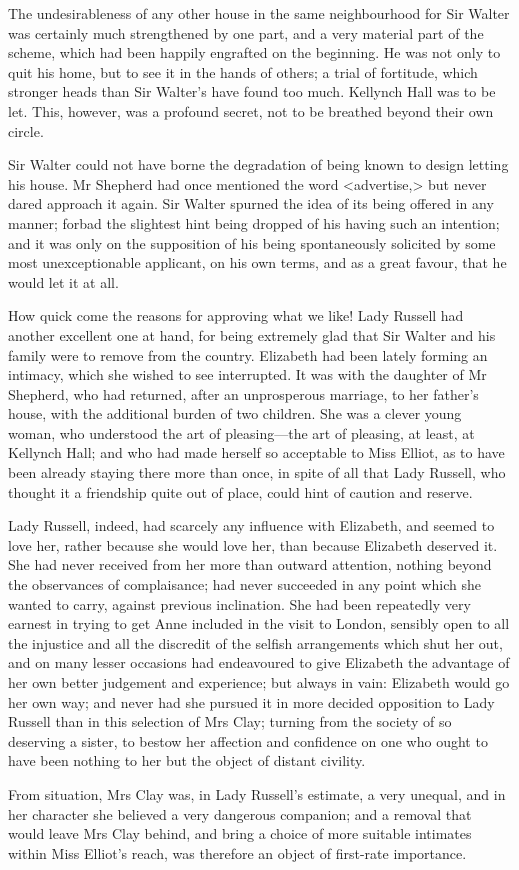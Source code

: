 The undesirableness of any other house in the same neighbourhood for Sir Walter was certainly much strengthened by one part, and a very material part of the scheme, which had been happily engrafted on the beginning. He was not only to quit his home, but to see it in the hands of others; a trial of fortitude, which stronger heads than Sir Walter's have found too much. Kellynch Hall was to be let. This, however, was a profound secret, not to be breathed beyond their own circle.

Sir Walter could not have borne the degradation of being known to design letting his house. Mr Shepherd had once mentioned the word <advertise,> but never dared approach it again. Sir Walter spurned the idea of its being offered in any manner; forbad the slightest hint being dropped of his having such an intention; and it was only on the supposition of his being spontaneously solicited by some most unexceptionable applicant, on his own terms, and as a great favour, that he would let it at all.

How quick come the reasons for approving what we like! Lady Russell had another excellent one at hand, for being extremely glad that Sir Walter and his family were to remove from the country. Elizabeth had been lately forming an intimacy, which she wished to see interrupted. It was with the daughter of Mr Shepherd, who had returned, after an unprosperous marriage, to her father's house, with the additional burden of two children. She was a clever young woman, who understood the art of pleasing—the art of pleasing, at least, at Kellynch Hall; and who had made herself so acceptable to Miss Elliot, as to have been already staying there more than once, in spite of all that Lady Russell, who thought it a friendship quite out of place, could hint of caution and reserve.

Lady Russell, indeed, had scarcely any influence with Elizabeth, and seemed to love her, rather because she would love her, than because Elizabeth deserved it. She had never received from her more than outward attention, nothing beyond the observances of complaisance; had never succeeded in any point which she wanted to carry, against previous inclination. She had been repeatedly very earnest in trying to get Anne included in the visit to London, sensibly open to all the injustice and all the discredit of the selfish arrangements which shut her out, and on many lesser occasions had endeavoured to give Elizabeth the advantage of her own better judgement and experience; but always in vain: Elizabeth would go her own way; and never had she pursued it in more decided opposition to Lady Russell than in this selection of Mrs Clay; turning from the society of so deserving a sister, to bestow her affection and confidence on one who ought to have been nothing to her but the object of distant civility.

From situation, Mrs Clay was, in Lady Russell's estimate, a very unequal, and in her character she believed a very dangerous companion; and a removal that would leave Mrs Clay behind, and bring a choice of more suitable intimates within Miss Elliot's reach, was therefore an object of first-rate importance.